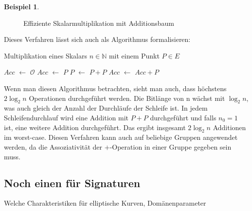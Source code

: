 \documentclass[hidelinks]{article}
\newcommand*\Let[2]{\State #1 $\gets$ #2}
\theoremstyle{plain}
\theoremstyle{definition}
\newtheorem{bsp}[thm]{Beispiel}
\theoremstyle{rem}
\newcommand{\patinf}{\mathcal{O}}
\begin{document}
\begin{sloppypar}
\begin{bsp}
\begin{figure}[H]
\begin{tikzpicture}
        \end{tikzpicture}
        \caption{Effiziente Skalarmultiplikation mit Additionsbaum}
    \end{figure}
\end{bsp}
Dieses Verfahren lässt sich auch als Algorithmus formalisieren:
\begin{algorithm}[H]
    \caption{Multiplikation eines Skalars $n \in \mathbb{N}$ mit einem Punkt $P \in E$ }
  \begin{algorithmic}[1]
    \Statex
    \Let{$Acc$}{$\patinf$} 
    \Else
    \Let{$Acc$}{$P$}
\EndIf
{}
      \Let{$P$}{$P + P$} 
      \Let{$Acc$}{$Acc + P$}
  \EndIf
      \EndFor
      \State {}
    \EndFunction
  \end{algorithmic}
\end{algorithm}
Wenn man diesen Algorithmus betrachten, sieht man auch, dass höchstens $2\log_2{n}$ Operationen durchgeführt werden. Die Bitlänge von n wächst mit $\log_2{n}$, was auch gleich der Anzahl der Durchläufe der Schleife ist. In jedem Schleifendurchlauf wird eine Addition mit $P+P$ durchgeführt und falls $n_0 = 1$ ist, eine weitere Addition durchgeführt. Das ergibt insgesamt $2\log_2{n}$ Additionen im worst-case. Diesen Verfahren kann auch auf beliebige Gruppen angewendet
werden, da die Assoziativität der $+$-Operation in einer Gruppe gegeben sein muss.

\subsection{Noch einen für Signaturen}
Welche Charakteristiken für elliptische Kurven, Domänenparameter

\end{sloppypar}
\newpage


\end{document}
